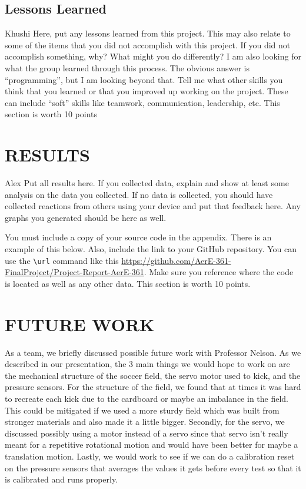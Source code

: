 \documentclass[12pt]{article}
\begin{document}
\subsection{Lessons Learned}
Khushi
Here, put any lessons learned from this project.  This may also relate to some of the items that you did not accomplish with this project. If you did not accomplish something, why? What might you do differently? I am also looking for what the group learned through this process. The obvious answer is ``programming'', but I am looking beyond that. Tell me what other skills you think that you learned or that you improved up working on the project. These can include ``soft'' skills like teamwork, communication, leadership, etc. This section is worth 10 points

\section{RESULTS}
 Alex
Put all results here.  If you collected data, explain and show at least some analysis on the data you collected.  If no data is collected, you should have collected reactions from others using your device and put that feedback here.  Any graphs you generated should be here as well.

You must include a copy of your source code in the appendix.  There is an example of this below.  Also, include the link to your GitHub repository.  You can use the \verb=\url=  command like this \url{https://github.com/AerE-361-FinalProject/Project-Report-AerE-361}. Make sure you reference where the code is located as well as any other data. This section is worth 10 points.


\section{FUTURE WORK}
As a team, we briefly discussed possible future work with Professor Nelson. As we described in our presentation, the 3 main things we would hope to work on are the mechanical structure of the soccer field, the servo motor used to kick, and the pressure sensors. For the structure of the field, we found that at times it was hard to recreate each kick due to the cardboard or maybe an imbalance in the field. This could be mitigated if we used a more sturdy field which was built from stronger materials and also made it a little bigger. Secondly, for the servo, we discussed possibly using a motor instead of a servo since that servo isn't really meant for a repetitive rotational motion and would have been better for maybe a translation motion. Lastly, we would work to see if we can do a calibration reset on the pressure sensors that averages the values it gets before every test so that it is calibrated and runs properly. 
\end{document}
